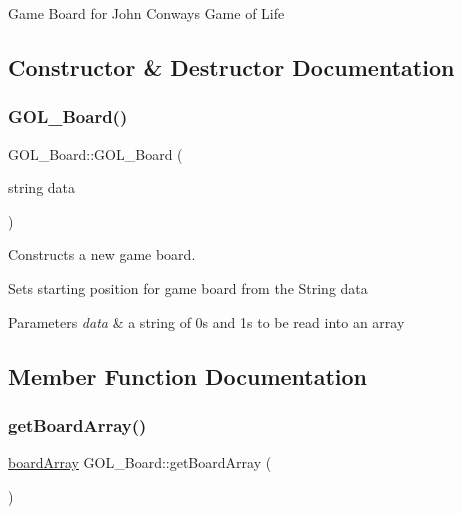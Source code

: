 Game Board for John Conway\textquotesingle{}s Game of Life 

\subsection{Constructor \& Destructor Documentation}
\mbox{\label{class_g_o_l___board_a3a9d866e9d8904ce39324f26f084eac4}} 
\subsubsection{\texorpdfstring{G\+O\+L\+\_\+\+Board()}{GOL\_Board()}}
{\footnotesize\ttfamily G\+O\+L\+\_\+\+Board\+::\+G\+O\+L\+\_\+\+Board (\begin{DoxyParamCaption}\item[{string}]{data }\end{DoxyParamCaption})}



Constructs a new game board. 

Sets starting position for game board from the String data 
\begin{DoxyParams}{Parameters}
{\em data} & a string of 0\textquotesingle{}s and 1\textquotesingle{}s to be read into an array \\
\hline
\end{DoxyParams}


\subsection{Member Function Documentation}
\mbox{\label{class_g_o_l___board_a958a4c2dfe07b3d88d003afb72b9435a}} 
\subsubsection{\texorpdfstring{get\+Board\+Array()}{getBoardArray()}}
{\footnotesize\ttfamily \hyperlink{_g_o_l___board_8h_aa8eecda883d639cd0032a7263411964f}{board\+Array} G\+O\+L\+\_\+\+Board\+::get\+Board\+Array (\begin{DoxyParamCaption}{ }\end{DoxyParamCaption})}



